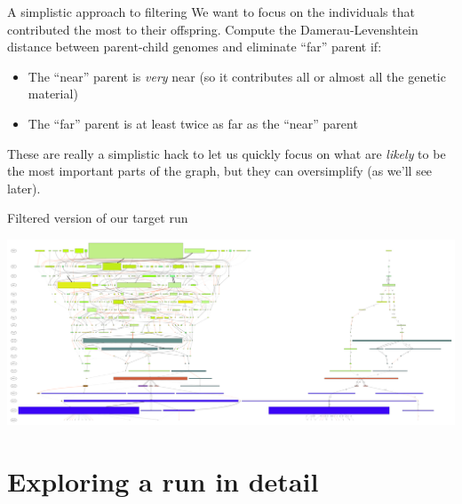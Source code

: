 \documentclass{beamer}
\newcommand{\linespace}{\vskip 0.25cm}
\begin{document}
\begin{frame}{A simplistic approach to filtering}
	We want to focus on the individuals that contributed the most to their offspring.
	\linespace
	Compute the Damerau-Levenshtein distance between parent-child genomes and eliminate ``far'' parent if:
	\begin{itemize}
		\item The ``near'' parent is \emph{very} near (so it contributes all or almost all the genetic material)
		\item The ``far'' parent is at least twice as far as the ``near'' parent
	\end{itemize}
	These are really a simplistic hack to let us quickly focus on what are \emph{likely} to be the most important parts of the graph, but they can oversimplify (as we'll see later).
\end{frame}

\begin{frame}{Filtered version of our target run}
	\begin{center}
		\includegraphics[width=\linewidth]{../../figures/run0_RBM_color_filtered_and_full_30000}
	\end{center}
\end{frame}

\section{Exploring a run in detail}
\end{document}
